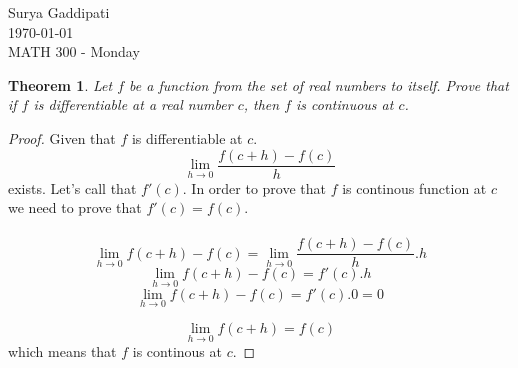 \documentclass[12pt]{article}
\begin{document}
 

Surya Gaddipati\\
\today\\
MATH 300 - Monday
\newtheorem*{KL}{Theorem }

\begin{KL} 
  Let $f$ be a function from the set of real numbers to itself. Prove that if $f$ is differentiable at a real number $c$, then $f$ is continuous at $c$.
\end{KL}
\begin{proof}
  Given that $f$ is differentiable at $c$. 
  \begin{equation}
    \lim_{h \to 0} \dfrac { f(c+h) - f(c) } {h} 
    \end{equation}
exists. Let's call that $f'(c)$. 
In order to prove that $f$ is continous function at $c$ we need to prove that $f'(c)=f(c)$.
 \paragraph{}
  \begin{equation}
    \lim_{h \to 0}  f(c+h) - f(c)  =  \lim_{h \to 0} \dfrac { f(c+h) - f(c) } {h}  . h 
    \end{equation}
  \begin{equation}
    \lim_{h \to 0}  f(c+h) - f(c)  =  f'(c) . h 
    \end{equation}
  \begin{equation}
    \lim_{h \to 0}  f(c+h) - f(c) =   f'(c) . 0 = 0 
    \end{equation}

  \begin{equation}
    \lim_{h \to 0}  f(c+h) =  f(c)  
    \end{equation}
which means that $f$ is continous at $c$.
\end{proof}
\end{document}
